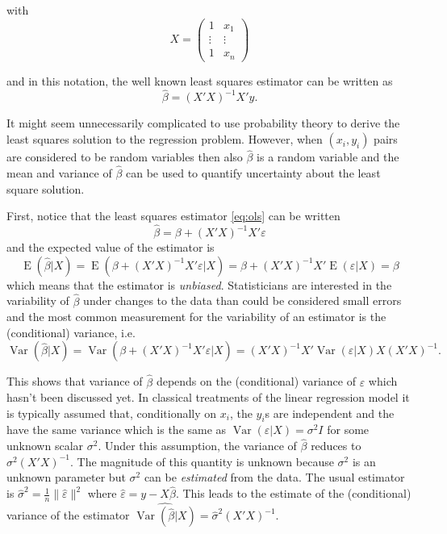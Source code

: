\documentclass[final,leqno]{siamltex1213}
\DeclareMathOperator{\E}{E}
\DeclareMathOperator{\Var}{Var}
\begin{document}
with
\begin{equation*}
    X = \begin{pmatrix}
        1 & x_1\\
        \vdots & \vdots \\
        1 & x_n
    \end{pmatrix}
\end{equation*}

and in this notation, the well known least squares estimator can be written as
\begin{equation}
\label{eq:ols}
    \hat{\beta} = (X'X)^{-1}X'y.
\end{equation}

It might seem unnecessarily complicated to use probability theory to derive the least squares solution to the regression problem. However, when $(x_i,y_i)$ pairs are considered to be random variables then also $\hat{\beta}$ is a random variable and the mean and variance of $\hat{\beta}$ can be used to quantify uncertainty about the least square solution.

First, notice that the least squares estimator \eqref{eq:ols} can be written
\begin{equation*}
    \hat{\beta} = \beta + (X'X)^{-1}X'\varepsilon
\end{equation*}
and the expected value of the estimator is
\begin{equation}
    \E(\hat{\beta}|X) = \E(\beta + (X'X)^{-1}X'\varepsilon|X) =
        \beta + (X'X)^{-1}X'\E(\varepsilon|X) = \beta
\end{equation}
which means that the estimator is \emph{unbiased}. Statisticians are interested in the variability of $\hat{\beta}$ under changes to the data than could be considered small errors and the most common measurement for the variability of an estimator is the (conditional) variance, i.e.
\begin{equation*}
    \Var(\hat{\beta}|X) = \Var(\beta + (X'X)^{-1}X'\varepsilon|X) =
        (X'X)^{-1}X'\Var(\varepsilon|X)X(X'X)^{-1}.
\end{equation*}

This shows that variance of $\hat{\beta}$ depends on the (conditional) variance of $\varepsilon$ which hasn't been discussed yet. In classical treatments of the linear regression model it is typically assumed that, conditionally on $x_i$, the $y_i$s are independent and the have the same variance which is the same as $\Var(\varepsilon|X)=\sigma^2 I$ for some unknown scalar $\sigma^2$. Under this assumption, the variance of $\hat{\beta}$ reduces to $\sigma^2 (X'X)^{-1}$. The magnitude of this quantity is unknown because $\sigma^2$ is an unknown parameter but $\sigma^2$ can be \emph{estimated} from the data. The usual estimator is $\hat{\sigma}^2=\frac{1}{n} \|\hat{\varepsilon}\|^2$ where $\hat{\varepsilon} = y - X\hat{\beta}$. This leads to the estimate of the (conditional) variance of the estimator $\widehat{\Var(\hat{\beta}|X)} = \hat{\sigma}^2(X'X)^{-1}$.
\end{document}
